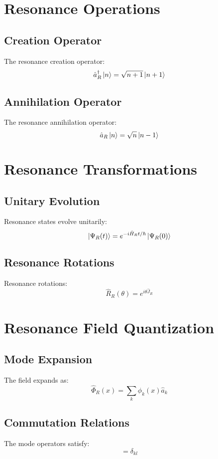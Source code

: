 \documentclass[12pt]{article}
\begin{document}
\section{Resonance Operations}
\subsection{Creation Operator}
The resonance creation operator:
\begin{equation}
\hat{a}_R^\dagger\ket{n} = \sqrt{n+1}\ket{n+1}
\end{equation}
\subsection{Annihilation Operator}
The resonance annihilation operator:
\begin{equation}
\hat{a}_R\ket{n} = \sqrt{n}\ket{n-1}
\end{equation}
\section{Resonance Transformations}
\subsection{Unitary Evolution}
Resonance states evolve unitarily:
\begin{equation}
\ket{\Psi_R(t)} = e^{-i\hat{H}_Rt/\hbar}\ket{\Psi_R(0)}
\end{equation}
\subsection{Resonance Rotations}
Resonance rotations:
\begin{equation}
\hat{R}_R(\theta) = e^{i\theta\hat{J}_R}
\end{equation}
\section{Resonance Field Quantization}
\subsection{Mode Expansion}
The field expands as:
\begin{equation}
\hat{\Phi}_R(x) = \sum_k \phi_k(x)\hat{a}_k
\end{equation}
\subsection{Commutation Relations}
The mode operators satisfy:
\begin{equation}
[\hat{a}_k,\hat{a}_l^\dagger] = \delta_{kl}
\end{equation}
\end{document}
